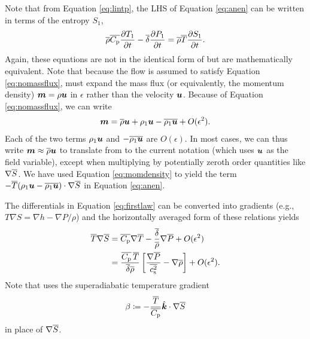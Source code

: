 \documentclass[12pt]{article}
\newcommand{\veck}{\hat{\bm{k}}}
\newcommand{\deltaref}{\overline{\delta}}
\newcommand{\cpref}{\overline{\cpcap}}
\newcommand{\cssqref}{\overline{\cs^2}}
\begin{document}
  Note that from Equation \eqref{eq:lintp}, the LHS of Equation \eqref{eq:anen} can be written in terms of the entropy $S_1$, 
  \begin{align}\label{eq:anenlhs}
  	\rhoref\cpref\pderiv{T_1}{t} - \deltaref\pderiv{P_1}{t} = \rhoref\tmpref\pderiv{S_1}{t}.
  \end{align}
  Again, these equations are not in the identical form of \citet{Gough1969} but are mathematically equivalent. Note that because the flow is assumed to satisfy Equation \eqref{eq:nomassflux}, \citet{Gough1969} must expand the mass flux (or equivalently, the momentum density) $\bm{m}=\rho\bm{u}$ in $\epsilon$ rather than the velocity $\bm{u}$. Because of Equation \eqref{eq:nomassflux}, we can write
  \begin{align}\label{eq:momdensity}
  	\bm{m} = \overline{\rho}\bm{u} + \rho_1\bm{u} - \overline{\rho_1\bm{u}} + O(\epsilon^2).
  \end{align}
  Each of the two terms $\rho_1\bm{u}$ and $-\overline{\rho_1\bm{u}}$ are $O(\epsilon)$. In most cases, we can thus write $\bm{m} \approx \overline{\rho} \bm{u}$ to translate from \citet{Gough1969} to the current notation (which uses $\bm{u}$ as the field variable), except when multiplying by potentially zeroth order quantities like $\nabla\overline{S}$. We have used Equation \eqref{eq:momdensity} to yield the term $- \overline{T}(\rho_1\bm{u}-\overline{\rho_1\bm{u}})\cdot\nabla\overline{S}$ in Equation \eqref{eq:anen}. 
  
  The differentials in Equation \eqref{eq:firstlaw} can be converted into gradients (e.g., $T\nabla S= \nabla h - \nabla P/\rho$) and the horizontally averaged form of these relations yields 
  \begin{subequations}\label{eq:anfirstlaw}
  \begin{align}
  	\tmpref\nabla\sref &= \cpref\nabla\tmpref - \frac{\deltaref}{\rhoref}\nabla\prsref + O(\epsilon^2)\\
  	 &= \frac{\cpref\,\tmpref}{\deltaref\rhoref}\left[\frac{\nabla\prsref}{\cssqref}-\nabla\rhoref\right]+O(\epsilon^2).
  \end{align}
  \end{subequations}
  Note that \citet{Gough1969} uses the superadiabatic temperature gradient
  \begin{align}
  	\beta\define -\frac{\tmpref}{\cpref}\veck\dotgrad\sref
  \end{align}
  in place of $\nabla \overline{S}$. 
  
\end{document}
